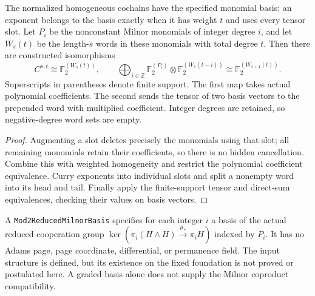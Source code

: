 \begin{proposition}
  \label{prop:h6-cobar-monomial-basis}
  \leanok
  The normalized homogeneous cochains have the specified monomial basis:
  an exponent belongs to the basis exactly when it has weight $t$ and
  uses every tensor slot. Let $P_i$ be the nonconstant Milnor monomials of
  integer degree $i$, and let $W_s(t)$ be the length-$s$ words in these
  monomials with total degree $t$. Then there are constructed isomorphisms
  \[
    C^{s,t}\cong\mathbb F_2^{(W_s(t))},\qquad
    \bigoplus_{i\in\mathbb Z}
       \mathbb F_2^{(P_i)}\otimes\mathbb F_2^{(W_s(t-i))}
       \cong\mathbb F_2^{(W_{s+1}(t))}.
  \]
  Superscripts in parentheses denote finite support. The first map takes
  actual polynomial coefficients. The second sends the tensor of two
  basis vectors to the prepended word with multiplied coefficient.
  Integer degrees are retained, so negative-degree word sets are empty.
\end{proposition}
\begin{proof}
  Augmenting a slot deletes precisely the monomials using that slot; all
  remaining monomials retain their coefficients, so there is no hidden
  cancellation. Combine this with weighted homogeneity and restrict the
  polynomial coefficient equivalence. Curry exponents into individual
  slots and split a nonempty word into its head and tail. Finally apply
  the finite-support tensor and direct-sum equivalences, checking their
  values on basis vectors.
  \leanok
\end{proof}

\begin{definition}
  \label{def:h6-reduced-milnor-basis-input}
  \leanok
  A \texttt{Mod2ReducedMilnorBasis} specifies for each integer $i$ a basis
  of the actual reduced cooperation group
  $\ker(\pi_i(H\wedge H)\xrightarrow{\mu_*}\pi_iH)$ indexed by $P_i$.
  It has no Adams page, page coordinate, differential, or permanence field.
  The input structure is defined, but its existence on the fixed foundation
  is not proved or postulated here. A graded basis alone does not supply
  the Milnor coproduct compatibility.
\end{definition}

